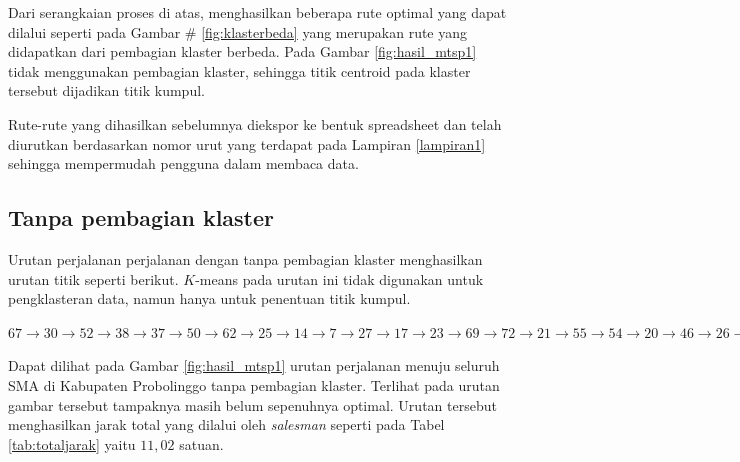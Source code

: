 Dari serangkaian proses di atas, menghasilkan beberapa rute optimal yang dapat dilalui seperti pada Gambar \# \ref{fig:klasterbeda} yang merupakan rute yang didapatkan dari pembagian klaster berbeda. Pada Gambar \ref{fig:hasil_mtsp1} tidak menggunakan pembagian klaster, sehingga titik centroid pada klaster tersebut dijadikan titik kumpul.

Rute-rute yang dihasilkan sebelumnya diekspor ke bentuk spreadsheet dan telah diurutkan berdasarkan nomor urut yang terdapat pada Lampiran \ref{lampiran1} sehingga mempermudah pengguna dalam membaca data.

\subsection{Tanpa pembagian klaster}

Urutan perjalanan perjalanan dengan tanpa pembagian klaster menghasilkan urutan titik seperti berikut. $K$-means pada urutan ini tidak digunakan untuk pengklasteran data, namun hanya untuk penentuan titik kumpul.

\noindent $
67 \rightarrow 30 \rightarrow 52 \rightarrow 38 \rightarrow 37 \rightarrow 50 \rightarrow 62 \rightarrow 25 \rightarrow 14 \rightarrow 7 \rightarrow 27 \rightarrow 17 \rightarrow 23 \rightarrow 69 \rightarrow 72 \rightarrow 21 \rightarrow 55 \rightarrow 54 \rightarrow 20 \rightarrow 46 \rightarrow 26 \rightarrow 59 \rightarrow 60 \rightarrow 16 \rightarrow 58 \rightarrow 45 \rightarrow 15 \rightarrow 65 \rightarrow 36 \rightarrow 18 \rightarrow 40 \rightarrow 70 \rightarrow 75 \rightarrow 2 \rightarrow 44 \rightarrow 11 \rightarrow 41 \rightarrow 53 \rightarrow 3 \rightarrow 71 \rightarrow 10 \rightarrow 6 \rightarrow 29 \rightarrow 74 \rightarrow 68 \rightarrow 47 \rightarrow 32 \rightarrow 56 \rightarrow 63 \rightarrow 9 \rightarrow 51 \rightarrow 49 \rightarrow 35 \rightarrow 1 \rightarrow 73 \rightarrow 24 \rightarrow 33 \rightarrow 57 \rightarrow 61 \rightarrow 22 \rightarrow 34 \rightarrow 8 \rightarrow 43 \rightarrow 66 \rightarrow 42 \rightarrow 13 \rightarrow 5 \rightarrow 4 \rightarrow 64 \rightarrow 31 \rightarrow 39 \rightarrow 19 \rightarrow 28 \rightarrow 48 \rightarrow 12$

Dapat dilihat pada Gambar \ref{fig:hasil_mtsp1} urutan perjalanan menuju seluruh SMA di Kabupaten Probolinggo tanpa pembagian klaster. Terlihat pada urutan gambar tersebut tampaknya masih belum sepenuhnya optimal. Urutan tersebut menghasilkan jarak total yang dilalui oleh \textit{salesman} seperti pada Tabel \ref{tab:totaljarak} yaitu $11,02$ satuan.

